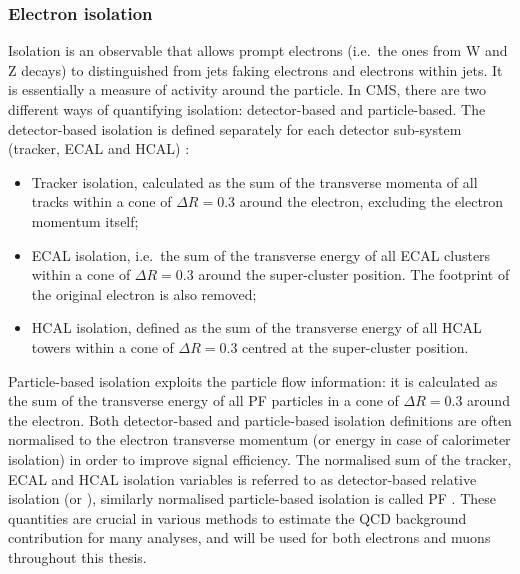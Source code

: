 \subsubsection{Electron isolation}
\label{sss:electron_isolation}

Isolation is an observable that allows prompt electrons (i.e.\ the ones from W and Z decays) to distinguished from jets
faking electrons and electrons within jets. It is essentially a measure of activity around the particle. In CMS, there
are two different ways of quantifying isolation: detector-based and particle-based. The detector-based isolation is
defined separately for each detector sub-system (tracker, ECAL and HCAL) \autocite{electron_reconstruction_ID_7TeV}:

\begin{itemize}
  \item Tracker isolation, calculated as the sum of the transverse momenta of all tracks within a cone of $\Delta R =
  0.3$ around the electron, excluding the electron momentum itself;
  \item ECAL isolation, i.e.\ the sum of the transverse energy of all ECAL clusters within a cone of $\Delta R = 0.3$
  around the super-cluster position. The footprint of the original electron is also removed;
  \item HCAL isolation, defined as the sum of the transverse energy of all HCAL towers within a cone of $\Delta R = 0.3$
  centred at the super-cluster position.
\end{itemize}

Particle-based isolation exploits the particle flow information: it is calculated as the sum of the transverse energy of
all PF particles in a cone of $\Delta R = 0.3$ around the electron. Both detector-based and particle-based isolation
definitions are often normalised to the electron transverse momentum (or energy in case of calorimeter isolation) in
order to improve signal efficiency. The normalised sum of the tracker, ECAL and HCAL isolation variables is referred to
as detector-based relative isolation (or \reliso), similarly normalised particle-based isolation is called PF \reliso.
These quantities are crucial in various methods to estimate the QCD background contribution for many analyses, and will
be used for both electrons and muons throughout this thesis.

